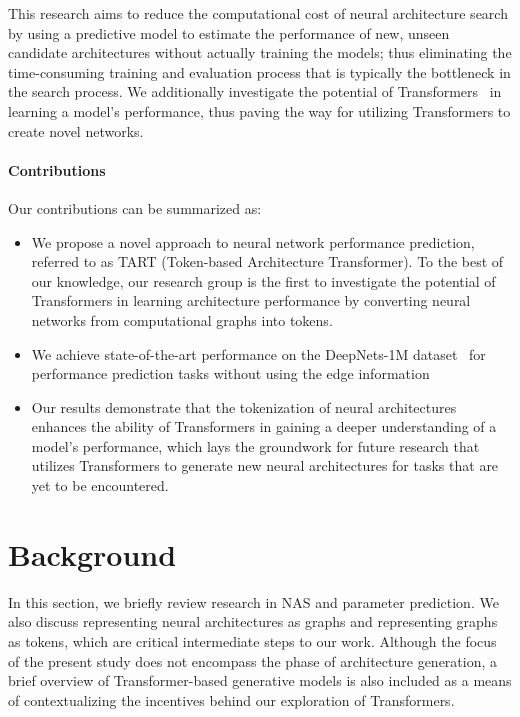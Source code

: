 \documentclass{article}
\begin{document}
This research aims to reduce the computational cost of neural architecture search by using a predictive model to estimate the performance of new, unseen candidate architectures without actually training the models; thus eliminating the time-consuming training and evaluation process that is typically the bottleneck in the search process.
We additionally investigate the potential of Transformers~\cite{attentionIsAllYouNeed} in learning a model's performance, thus paving the way for utilizing Transformers to create novel networks.

\paragraph{Contributions} Our contributions can be summarized as:
\begin{itemize}
    \item We propose a novel approach to neural network performance prediction, referred to as TART (Token-based Architecture Transformer). To the best of our knowledge, our research group is the first to investigate the potential of Transformers in learning architecture performance by converting neural networks from computational graphs into tokens.
    
    \item We achieve state-of-the-art performance on the DeepNets-1M dataset~\cite{ppuda} for performance prediction tasks without using the edge information

    \item Our results demonstrate that the tokenization of neural architectures enhances the ability of Transformers in gaining a deeper understanding of a model's performance, which lays the groundwork for future research that utilizes Transformers to generate new neural architectures for tasks that are yet to be encountered.
    
\end{itemize}


\section{Background}

In this section, we briefly review research in NAS and parameter prediction. We also discuss representing neural architectures as graphs and representing graphs as tokens, which are critical intermediate steps to our work. Although the focus of the present study does not encompass the phase of architecture generation, a brief overview of Transformer-based generative models is also included as a means of contextualizing the incentives behind our exploration of Transformers.
\end{document}

